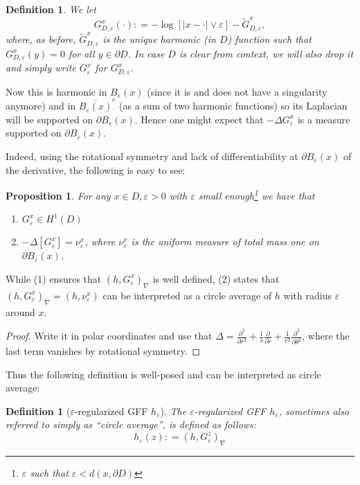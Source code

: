 \documentclass[11pt,reqno]{amsart}
\numberwithin{equation}{section}
\newtheorem{pro}[thm]{Proposition}
\newtheorem{defi}[thm]{Definition}
\newcommand{\deq}{\mathrel{\mathop:}=}
\newcommand{\eps}{\varepsilon}
\begin{document}
\begin{defi}\label{def:truncatedGreensFct}
	We let
	$$G_{D,\eps}^x(\cdot)\deq -\log[|x-\cdot|\vee \eps]-\tilde G_{D,\eps}^x,$$
	where, as before, $\tilde G_{D,\eps}^x$ is the unique harmonic (in $D$) function such that $G_{D,\eps}^x(y)=0$ for all $y\in \partial D$. In case $D$ is clear from context, we will also drop it and simply write $G_\eps^x$ for $G_{D,\eps}^x$.
\end{defi}

Now this is harmonic in $B_\eps(x)$ (since it is and does not have a singularity anymore) and in $\overline{B_\eps(x)}^c$ (as a sum of two harmonic functions) so its Laplacian will be supported on $\partial B_\eps(x)$. Hence one might expect that $-\Delta G_\eps^x$ is a measure supported on $\partial B_\eps(x)$. 

Indeed, using the rotational symmetry and lack of differentiability at $\partial B_\eps(x)$ of the derivative, the following is easy to see:

\begin{pro}\label{prop:circleAvg}
	For any $x\in D, \eps>0$ with $\eps$ small enough\footnote{$\eps$ such that $\eps<d(x,\partial D)$} we have that 
	\begin{enumerate}
		\item $G_\eps^x\in H^1(D)$
		\item $-\Delta[G_\eps^x] = \nu_\eps^x$, where $\nu_\eps^x$ is the uniform measure of total mass one on $\partial B_\eps(x)$.
	\end{enumerate}
\end{pro}

While (1) ensures that $(h,G_\eps^x)_\nabla$ is well defined, (2) states that $(h,G_\eps^x)_\nabla = (h,\nu_\eps^x)$ can be interpreted as a circle average of $h$ with radius $\eps$ around $x$.
\begin{proof}
	Write it in polar coordinates and use that $\Delta = \frac{\partial^2}{\partial r^2}+\frac{1}{r}\frac{\partial}{\partial r}+\frac{1}{r^2}\frac{\partial^2}{\partial\theta^2}$, where the last term vanishes by rotational symmetry.
\end{proof}

Thus the following definition is well-posed and can be interpreted as circle average:

\begin{defi}[$\eps$-regularized GFF $h_\eps$] The $\eps$-regularized GFF $h_\eps$, sometimes also referred to simply as ``circle average'', is defined as follows:
	$$h_\eps(z)\deq (h,G_\eps^z)_\nabla$$
\end{defi}
\end{document}
